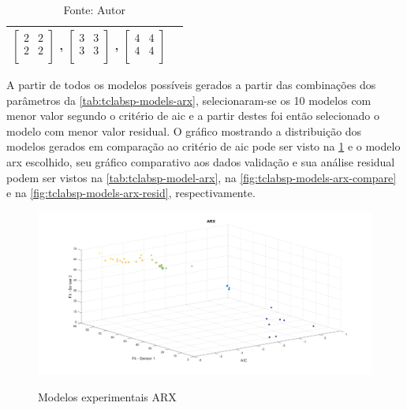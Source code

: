 \begin{table}[h]
\begin{tabular}{c|c}
							$ \begin{bmatrix}	2	&	2	\\	2	&	2	\\	\end{bmatrix} $	,		
							$ \begin{bmatrix}	3	&	3	\\	3	&	3	\\	\end{bmatrix} $	,		
							$ \begin{bmatrix}	4	&	4	\\	4	&	4	\\	\end{bmatrix} $		\\ \bottomrule
	\end{tabular}
	\caption*{Fonte: Autor}
\end{table}

A partir de todos os modelos possíveis gerados a partir das combinações dos parâmetros da \cref{tab:tclabsp-models-arx},
selecionaram-se os 10 modelos com menor valor segundo o critério de \acrshort{aic} e a partir destes foi então
selecionado o modelo com menor valor residual.
O gráfico mostrando a distribuição dos modelos gerados em comparação ao critério de \acrshort{aic} pode ser
visto na \cref{fig:tclabsp-models-arx} e o modelo \acrshort{arx} escolhido, seu gráfico comparativo aos dados validação
e sua análise residual podem ser vistos na \cref{tab:tclabsp-model-arx}, na \cref{fig:tclabsp-models-arx-compare} e na
\cref{fig:tclabsp-models-arx-resid}, respectivamente.

\begin{figure}[h]
	\caption{Modelos experimentais ARX}
	\begin{center}
		\includegraphics[width=1.00\textwidth]{./5_images/tclabsp-models-ARX.png} 
		\label{fig:tclabsp-models-arx}
	\end{center}
	\centering
\end{figure}

